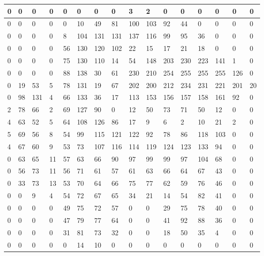 \documentclass{report}
\begin{document}
\begin{table}
    \centering
    \footnotesize
    \begin{tabular}{|l|l|l|l|l|l|l|l|l|l|l|l|l|l|l|l|}
    \hline
        0 & 0 & 0 & 0 & 0 & 0 & 0 & 0 & 3 & 2 & 0 & 0 & 0 & 0 & 0 & 0 \\ \hline
        0 & 0 & 0 & 0 & 0 & 10 & 49 & 81 & 100 & 103 & 92 & 44 & 0 & 0 & 0 & 0 \\ \hline
        0 & 0 & 0 & 0 & 8 & 104 & 131 & 131 & 137 & 116 & 99 & 95 & 36 & 0 & 0 & 0 \\ \hline
        0 & 0 & 0 & 0 & 56 & 130 & 120 & 102 & 22 & 15 & 17 & 21 & 18 & 0 & 0 & 0 \\ \hline
        0 & 0 & 0 & 0 & 75 & 130 & 110 & 14 & 54 & 148 & 203 & 230 & 223 & 141 & 1 & 0 \\ \hline
        0 & 0 & 0 & 0 & 88 & 138 & 30 & 61 & 230 & 210 & 254 & 255 & 255 & 255 & 126 & 0 \\ \hline
        0 & 19 & 53 & 5 & 78 & 131 & 19 & 67 & 202 & 200 & 212 & 234 & 231 & 221 & 201 & 20 \\ \hline
        0 & 98 & 131 & 4 & 66 & 133 & 36 & 17 & 113 & 153 & 156 & 157 & 158 & 161 & 92 & 0 \\ \hline
        2 & 78 & 66 & 2 & 69 & 127 & 90 & 0 & 12 & 50 & 73 & 71 & 50 & 12 & 0 & 0 \\ \hline
        4 & 63 & 52 & 5 & 64 & 108 & 126 & 86 & 17 & 9 & 6 & 2 & 10 & 21 & 2 & 0 \\ \hline
        5 & 69 & 56 & 8 & 54 & 99 & 115 & 121 & 122 & 92 & 78 & 86 & 118 & 103 & 0 & 0 \\ \hline
        4 & 67 & 60 & 9 & 53 & 73 & 107 & 116 & 114 & 119 & 124 & 123 & 133 & 94 & 0 & 0 \\ \hline
        0 & 63 & 65 & 11 & 57 & 63 & 66 & 90 & 97 & 99 & 99 & 97 & 104 & 68 & 0 & 0 \\ \hline
        0 & 56 & 73 & 11 & 56 & 71 & 61 & 57 & 61 & 63 & 66 & 64 & 67 & 43 & 0 & 0 \\ \hline
        0 & 33 & 73 & 13 & 53 & 70 & 64 & 66 & 75 & 77 & 62 & 59 & 76 & 46 & 0 & 0 \\ \hline
        0 & 0 & 9 & 4 & 54 & 72 & 67 & 65 & 34 & 21 & 14 & 54 & 82 & 41 & 0 & 0 \\ \hline
        0 & 0 & 0 & 0 & 49 & 75 & 72 & 57 & 0 & 0 & 29 & 75 & 78 & 40 & 0 & 0 \\ \hline
        0 & 0 & 0 & 0 & 47 & 79 & 77 & 64 & 0 & 0 & 41 & 92 & 88 & 36 & 0 & 0 \\ \hline
        0 & 0 & 0 & 0 & 31 & 81 & 73 & 32 & 0 & 0 & 18 & 50 & 35 & 4 & 0 & 0 \\ \hline
        0 & 0 & 0 & 0 & 0 & 14 & 10 & 0 & 0 & 0 & 0 & 0 & 0 & 0 & 0 & 0 \\ \hline
    \end{tabular}
\end{table}
\end{document}
